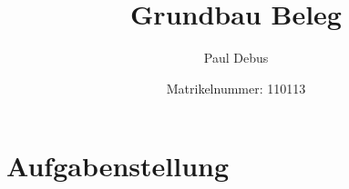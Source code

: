 \documentclass[11pt,fleqn,halfparskip]{article}
\title{Grundbau Beleg}
\author{Paul Debus \and Matrikelnummer: 110113}
\begin{document}
\maketitle
\tableofcontents
\newpage
{}
\section{Aufgabenstellung}
\end{document}
